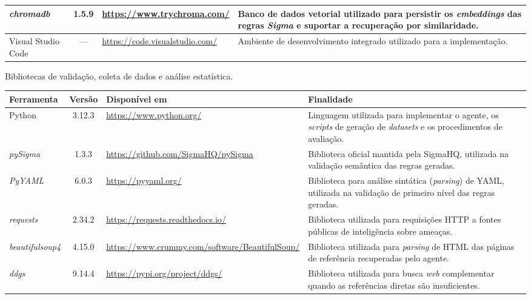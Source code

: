 \begin{tabframed}[!htb]
\begin{tabular}{|p{2.7cm}|c|>{\raggedright\arraybackslash}p{3.5cm}|>{\raggedright\arraybackslash}p{6cm}|}
		\emph{chromadb} & 1.5.9 & \url{https://www.trychroma.com/} &
		Banco de dados vetorial utilizado para persistir os \emph{embeddings} das regras \emph{Sigma} e suportar a recuperação por similaridade. \\
		\hline
		
		Visual Studio Code & --- & \url{https://code.visualstudio.com/} &
		Ambiente de desenvolvimento integrado utilizado para a implementação. \\
		\hline
		
	\end{tabular}
	\fonte{}
\end{tabframed}

\begin{tabframed}[!htb]
	\centering
	\caption{Bibliotecas de validação, coleta de dados e análise estatística.\label{quad:materiais3}}
	\footnotesize
	\begin{tabular}{|p{2.7cm}|c|>{\raggedright\arraybackslash}p{3.5cm}|>{\raggedright\arraybackslash}p{6cm}|}
		\hline
		\textbf{Ferramenta} & \textbf{Versão} & \textbf{Disponível em} & \textbf{Finalidade} \\
		\hline
		
		Python & 3.12.3 & \url{https://www.python.org/} &
		Linguagem utilizada para implementar o agente, os \emph{scripts} de geração de \emph{datasets} e os procedimentos de avaliação. \\
		\hline
		
		\emph{pySigma} & 1.3.3 & \url{https://github.com/SigmaHQ/pySigma} &
		Biblioteca oficial mantida pela SigmaHQ, utilizada na validação semântica das regras geradas. \\
		\hline
		
		\emph{PyYAML} & 6.0.3 & \url{https://pyyaml.org/} &
		Biblioteca para análise sintática (\emph{parsing}) de YAML, utilizada na validação de primeiro nível das regras geradas. \\
		\hline
		
		\emph{requests} & 2.34.2 & \url{https://requests.readthedocs.io/} &
		Biblioteca utilizada para requisições HTTP a fontes públicas de inteligência sobre ameaças. \\
		\hline
		
		\emph{beautifulsoup4} & 4.15.0 & \url{https://www.crummy.com/software/BeautifulSoup/} &
		Biblioteca utilizada para \emph{parsing} de HTML das páginas de referência recuperadas pelo agente. \\
		\hline
		
		\emph{ddgs} & 9.14.4 & \url{https://pypi.org/project/ddgs/} &
		Biblioteca utilizada para busca \emph{web} complementar quando as referências diretas são insuficientes. \\
		\hline
		

\end{tabular}
\end{tabframed}
